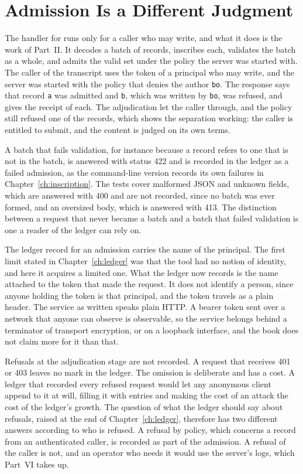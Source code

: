\section{Admission Is a Different Judgment}



The handler for  runs only for a caller who may write, and what it does is the work of Part~II. It decodes a batch of records, inscribes each, validates the batch as a whole, and admits the valid set under the policy the server was started with. The caller of the transcript uses the token of a principal who may write, and the server was started with the policy that denies the author \texttt{bo}. The response says that record \texttt{a} was admitted and \texttt{b}, which was written by \texttt{bo}, was refused, and gives the receipt of each. The adjudication let the caller through, and the policy still refused one of the records, which shows the separation working: the caller is entitled to submit, and the content is judged on its own terms.

A batch that fails validation, for instance because a record refers to one that is not in the batch, is answered with status 422 and is recorded in the ledger as a failed admission, as the command-line version records its own failures in Chapter~\ref{ch:inscription}. The tests cover malformed JSON and unknown fields, which are answered with 400 and are not recorded, since no batch was ever formed, and an oversized body, which is answered with 413. The distinction between a request that never became a batch and a batch that failed validation is one a reader of the ledger can rely on.

The ledger record for an admission carries the name of the principal. The first limit stated in Chapter~\ref{ch:ledger} was that the tool had no notion of identity, and here it acquires a limited one. What the ledger now records is the name attached to the token that made the request. It does not identify a person, since anyone holding the token is that principal, and the token travels as a plain header. The service as written speaks plain HTTP. A bearer token sent over a network that anyone can observe is observable, so the service belongs behind a terminator of transport encryption, or on a loopback interface, and the book does not claim more for it than that.

Refusals at the adjudication stage are not recorded. A request that receives 401 or 403 leaves no mark in the ledger. The omission is deliberate and has a cost. A ledger that recorded every refused request would let any anonymous client append to it at will, filling it with entries and making the cost of an attack the cost of the ledger's growth. The question of what the ledger should say about refusals, raised at the end of Chapter~\ref{ch:ledger}, therefore has two different answers according to who is refused. A refusal by policy, which concerns a record from an authenticated caller, is recorded as part of the admission. A refusal of the caller is not, and an operator who needs it would use the server's logs, which Part~VI takes up.

